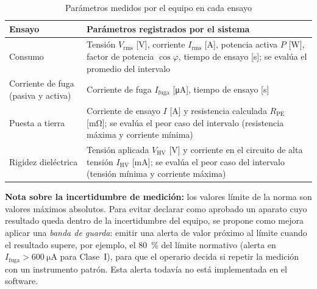 \begin{table}[H]
\centering
\caption{Parámetros medidos por el equipo en cada ensayo}
\label{tab:parametros_medidos}
\renewcommand{\arraystretch}{1.35}
\begin{tabular}{@{} p{3.5cm} p{8.5cm} @{}}
\toprule
\textbf{Ensayo} & \textbf{Parámetros registrados por el sistema} \\
\midrule
Consumo
    & Tensión $V_{\text{rms}}$ [\si{\volt}], corriente $I_{\text{rms}}$
      [\si{\ampere}], potencia activa $P$ [\si{\watt}], factor de potencia
      $\cos\varphi$, tiempo de ensayo [\si{\second}]; se evalúa el promedio
      del intervalo \\
\addlinespace
Corriente de fuga (pasiva y activa)
    & Corriente de fuga $I_{\text{fuga}}$ [\si{\micro\ampere}],
      tiempo de ensayo [\si{\second}] \\
\addlinespace
Puesta a tierra
    & Corriente de ensayo $I$ [\si{\ampere}] y resistencia calculada
      $R_{\text{PE}}$ [\si{\milli\ohm}]; se evalúa el peor caso del
      intervalo (resistencia máxima y corriente mínima) \\
\addlinespace
Rigidez dieléctrica
    & Tensión aplicada $V_{\text{HV}}$ [\si{\volt}] y corriente en el
      circuito de alta tensión $I_{\text{HV}}$ [\si{\milli\ampere}]; se
      evalúa el peor caso del intervalo (tensión mínima y corriente máxima) \\
\bottomrule
\end{tabular}
\end{table}

\noindent\textbf{Nota sobre la incertidumbre de medición:}
los valores límite de la norma son valores máximos absolutos. Para evitar
declarar como aprobado un aparato cuyo resultado queda dentro de la
incertidumbre del equipo, se propone como mejora aplicar una \emph{banda de
guarda}: emitir una alerta de valor próximo al límite cuando el resultado
supere, por ejemplo, el \SI{80}{\percent} del límite normativo (alerta en
$I_{\text{fuga}} > \SI{600}{\micro\ampere}$ para Clase~I), para que el operario
decida si repetir la medición con un instrumento patrón. Esta alerta todavía no
está implementada en el software.
